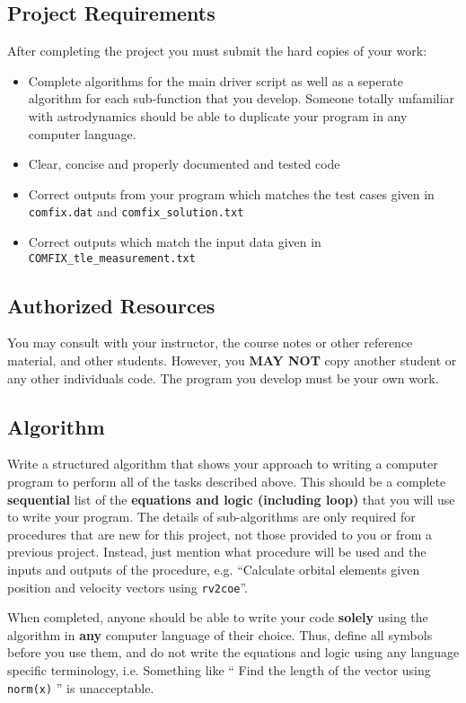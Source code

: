 \documentclass[11pt, reqno]{article}    %
\begin{document}
\subsection*{Project Requirements}
After completing the project you must submit the hard copies of your work:
\begin{itemize}
    \item Complete algorithms for the main driver script as well as a seperate algorithm for each sub-function that you develop.
        Someone totally unfamiliar with astrodynamics should be able to duplicate your program in any computer language.
    \item Clear, concise and properly documented and tested code
    \item Correct outputs from your program which matches the test cases given in \texttt{comfix.dat} and \texttt{comfix\_solution.txt}
    \item Correct outputs which match the input data given in \texttt{COMFIX\_tle\_measurement.txt}
\end{itemize}

\subsection*{Authorized Resources}
You may consult with your instructor, the course notes or other reference material, and other students. 
However, you \textbf{MAY NOT} copy another student or any other individuals code. 
The program you develop must be your own work.

\subsection*{Algorithm}

Write a structured algorithm that shows your approach to writing a computer program to perform all of the tasks described above.
This should be a complete \textbf{sequential} list of the \textbf{equations and logic (including loop)} that you will use to write your program.
The details of sub-algorithms are only required for procedures that are new for this project, not those provided to you or from a previous project.
Instead, just mention what procedure will be used and the inputs and outputs of the procedure, e.g. ``Calculate orbital elements given position and velocity vectors using \texttt{rv2coe}''.

When completed, anyone should be able to write your code \textbf{solely} using the algorithm in \textbf{any} computer language of their choice.
Thus, define all symbols before you use them, and do not write the equations and logic using any language specific terminology, i.e. Something like `` Find the length of the vector using \texttt{norm(x)} '' is unacceptable.
\end{document}
